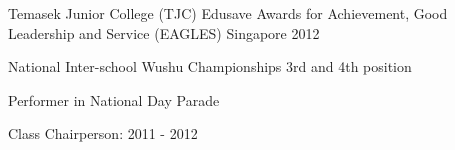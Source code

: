 \begin{cventries}
  \cventry
    {Temasek Junior College (TJC)} %
    {Edusave Awards for Achievement, Good Leadership and Service (EAGLES)} %
    {Singapore} %
    {2012} %
    {
      \begin{cvitems} %
        \item {National Inter-school Wushu Championships 3rd and 4th position}
        \item {Performer in National Day Parade}
        \item {Class Chairperson: 2011 - 2012}
      \end{cvitems}
    }

\end{cventries}
